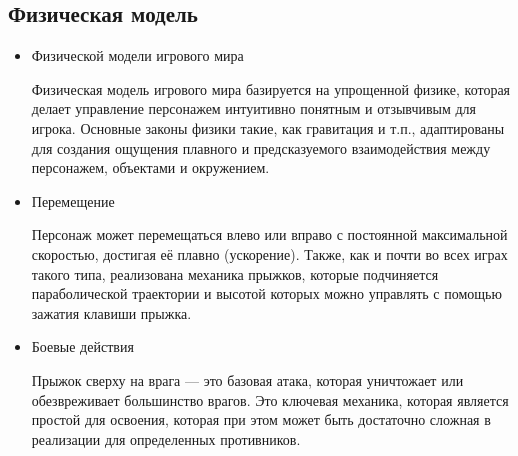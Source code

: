 \subsection{Физическая модель}
\begin{itemize}
    \item Физической модели игрового мира \par
    Физическая модель игрового мира базируется на упрощенной физике, которая делает управление персонажем интуитивно понятным и отзывчивым для игрока. Основные законы физики такие, как гравитация и т.п., адаптированы для создания ощущения плавного и предсказуемого взаимодействия между персонажем, объектами и окружением.
    \item Перемещение \par
    Персонаж может перемещаться влево или вправо с постоянной максимальной скоростью, достигая её плавно (ускорение). Также, как и почти во всех играх такого типа, реализована механика прыжков, которые подчиняется параболической траектории и высотой которых можно управлять с помощью зажатия клавиши прыжка.
    \item Боевые действия \par
    Прыжок сверху на врага — это базовая атака, которая уничтожает или обезвреживает большинство врагов. Это ключевая механика, которая является простой для освоения, которая при этом может быть достаточно сложная в реализации для определенных противников.
\end{itemize}